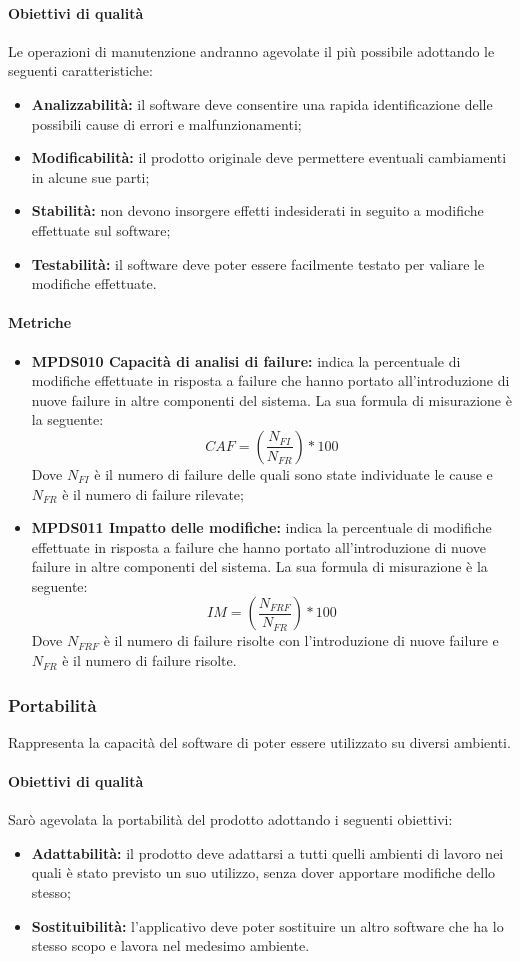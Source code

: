 \documentclass[NormeDiProgetto.tex]{subfiles}
\begin{document}
	\paragraph{Obiettivi di qualità}
	Le operazioni di manutenzione andranno agevolate il più possibile adottando le seguenti caratteristiche:
	\begin{itemize}
		\item \textbf{Analizzabilità:} il software deve consentire una rapida identificazione delle possibili cause di errori e malfunzionamenti;
		\item \textbf{Modificabilità:} il prodotto originale deve permettere eventuali cambiamenti in alcune sue parti;
		\item \textbf{Stabilità:} non devono insorgere effetti indesiderati in seguito a modifiche effettuate sul software;
		\item \textbf{Testabilità:} il software deve poter essere facilmente testato per valiare le modifiche effettuate.
	\end{itemize}
	\paragraph{Metriche}
	\begin{itemize}
		\item \textbf{MPDS010 Capacità di analisi di failure:} indica la percentuale di modifiche effettuate in risposta a failure che hanno portato all'introduzione di nuove failure in altre componenti del sistema. La sua formula di misurazione è la seguente: \[CAF=(\frac{N_{FI}}{N_{FR}})*100\] Dove $ N_{FI} $ è il numero di failure delle quali sono state individuate le cause e $ N_{FR} $ è il numero di failure rilevate;
		\item \textbf{MPDS011 Impatto delle modifiche:} indica la percentuale di modifiche effettuate in risposta a failure che hanno portato all'introduzione di nuove failure in altre componenti del sistema. La sua formula di misurazione è la seguente: \[IM=(\frac{N_{FRF}}{N_{FR}})*100\] Dove $ N_{FRF} $ è il numero di failure risolte con l'introduzione di nuove failure e $ N_{FR} $ è il numero di failure risolte.
	\end{itemize}
	\subsubsection{Portabilità}
	Rappresenta la capacità del software di poter essere utilizzato su diversi ambienti.
	\paragraph{Obiettivi di qualità}
	Sarò agevolata la portabilità del prodotto adottando i seguenti obiettivi:
	\begin{itemize}
		\item \textbf{Adattabilità:} il prodotto deve adattarsi a tutti quelli ambienti di lavoro nei quali è stato previsto un suo utilizzo, senza dover apportare modifiche dello stesso;
		\item \textbf{Sostituibilità:} l'applicativo deve poter sostituire un altro software che ha lo stesso scopo e lavora nel medesimo ambiente.
	\end{itemize}
\end{document}
